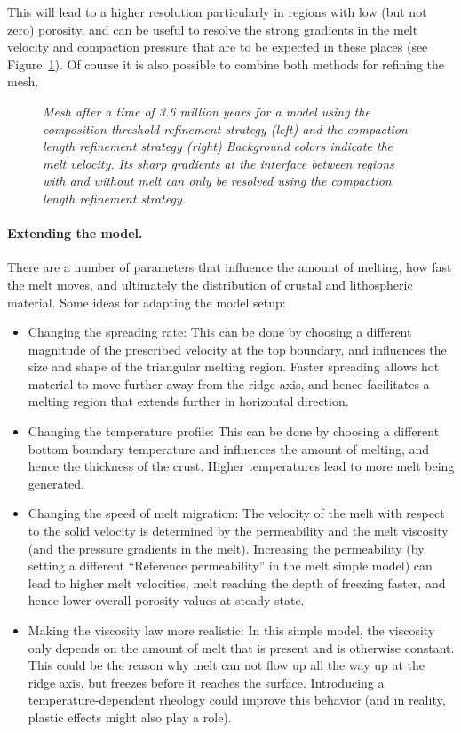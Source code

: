 This will lead to a higher resolution particularly in regions with low (but not zero) porosity,
and can be useful to resolve the strong gradients in the melt velocity and compaction pressure that
are to be expected in these places (see Figure~\ref{fig:mid-ocean-ridge-mesh}).
Of course it is also possible to combine both methods for refining the mesh.

\begin{figure}
    \centering
    
    \caption{\it Mesh after a time of 3.6 million years for a model using the composition threshold
             refinement strategy (left) and the compaction length refinement strategy (right)
             Background colors indicate the melt velocity. Its sharp gradients at the interface
             between regions with and without melt can only be resolved using the compaction
             length refinement strategy.}
    \label{fig:mid-ocean-ridge-mesh}
\end{figure}

\paragraph{Extending the model.}
There are a number of parameters that influence the amount of melting, how fast the melt moves, and ultimately the distribution of crustal and lithospheric material.
Some ideas for adapting the model setup:
\begin{itemize}
  \item Changing the spreading rate: This can be done by choosing a different magnitude of the
        prescribed velocity at the top boundary, and influences the size and shape of the triangular
        melting region. Faster spreading allows hot material to move further away from the ridge axis,
        and hence facilitates a melting region that extends further in horizontal direction.
  \item Changing the temperature profile: This can be done by choosing a different bottom boundary
        temperature and influences the amount of melting, and hence the thickness of the crust.
        Higher temperatures lead to more melt being generated.
  \item Changing the speed of melt migration: The velocity of the melt with respect to the solid velocity
        is determined by the permeability and the melt viscosity (and the pressure gradients in the melt).
        Increasing the permeability (by setting a different ``Reference permeability'' in the melt simple
        model) can lead to higher melt velocities, melt reaching the depth of freezing faster, and hence
        lower overall porosity values at steady state.
  \item Making the viscosity law more realistic: In this simple model, the viscosity only depends on the
        amount of melt that is present and is otherwise constant. This could be the reason why melt can
        not flow up all the way up at the ridge axis, but freezes before it reaches the surface.
        Introducing a temperature-dependent rheology could improve this behavior (and in reality, plastic
        effects might also play a role).
\end{itemize}
